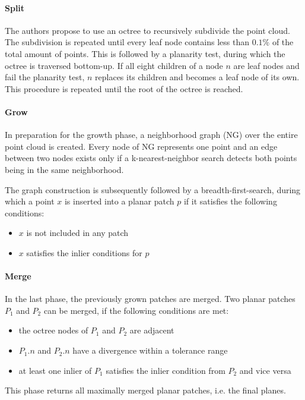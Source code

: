 \documentclass[main.tex]{subfiles}
\begin{document}
\paragraph*{Split}
The authors propose to use an octree to recursively subdivide the point cloud. The subdivision is repeated until every leaf node contains less than $0.1\%$ of the total amount
of points.
This is followed by a planarity test, during which the octree is traversed bottom-up. If all eight children of a node $n$ are leaf nodes and fail the planarity test, $n$ replaces its children
and becomes a leaf node of its own. This procedure is repeated until the root of the octree is reached.

\paragraph*{Grow}
In preparation for the growth phase, a neighborhood graph (NG) over the entire point cloud is created. Every node of NG represents one point and an edge between two nodes exists only if
a k-nearest-neighbor search detects both points being in the same neighborhood.

The graph construction is subsequently followed by a breadth-first-search, during which a point $x$ is inserted into a planar patch $p$ if it satisfies the following conditions:
\begin{itemize}
    \item $x$ is not included in any patch
    \item $x$ satisfies the inlier conditions for $p$ %
\end{itemize}

\paragraph*{Merge}
In the last phase, the previously grown patches are merged. Two planar patches $P_1$ and $P_2$ can be merged, if the following conditions are met:
\begin{itemize}
    \item the octree nodes of $P_1$ and $P_2$ are adjacent
    \item $P_1.n$ and $P_2.n$ have a divergence within a tolerance range
    \item at least one inlier of $P_1$ satisfies the inlier condition from $P_2$ and vice versa
\end{itemize}

This phase returns all maximally merged planar patches, i.e. the final planes.
\end{document}
